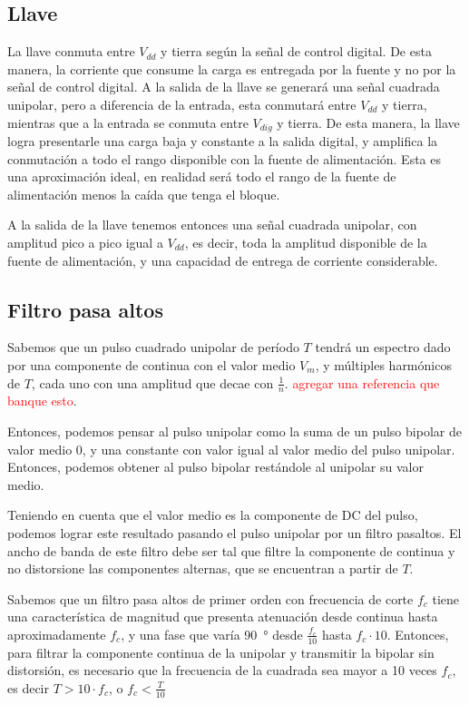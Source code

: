\subsection{Llave}

La llave conmuta entre $V_{dd}$ y tierra según la señal de control digital. De
esta manera, la corriente que consume la carga es entregada por la fuente y no
por la señal de control digital. A la salida de la llave se generará una señal
cuadrada unipolar, pero a diferencia de la entrada, esta conmutará entre
$V_{dd}$ y tierra, mientras que a la entrada se conmuta entre $V_{dig}$ y
tierra. De esta manera, la llave logra presentarle una carga baja y constante a
la salida digital, y amplifica la conmutación a todo el rango disponible con la
fuente de alimentación. Esta es una aproximación ideal, en realidad será todo el
rango de la fuente de alimentación menos la caída que tenga el bloque.

A la salida de la llave tenemos entonces una señal cuadrada unipolar, con
amplitud pico a pico igual a $V_{dd}$, es decir, toda la amplitud disponible de
la fuente de alimentación, y una capacidad de entrega de corriente considerable.

\subsection{Filtro pasa altos}

Sabemos que un pulso cuadrado unipolar de período $T$ tendrá un espectro dado
por una componente de continua con el valor medio $V_{m}$, y múltiples
harmónicos de $T$, cada uno con una amplitud que decae con $\frac{1}{n}$.
\textcolor{red}{agregar una referencia que banque esto}.

Entonces, podemos pensar al pulso unipolar como la suma de un pulso bipolar de
valor medio 0, y una constante con valor igual al valor medio del pulso
unipolar. Entonces, podemos obtener al pulso bipolar restándole al unipolar su
valor medio.

Teniendo en cuenta que el valor medio es la componente de DC del pulso, podemos
lograr este resultado pasando el pulso unipolar por un filtro pasaltos. El ancho
de banda de este filtro debe ser tal que filtre la componente de continua y no
distorsione las componentes alternas, que se encuentran a partir de $T$.

Sabemos que un filtro pasa altos de primer orden con frecuencia de corte $f_c$
tiene una característica de magnitud que presenta atenuación desde continua hasta
aproximadamente $f_c$, y una fase que varía \qty{90}{\degree} desde
$\frac{f_c}{10}$ hasta $f_c \cdot 10$. Entonces, para filtrar la componente
continua de la unipolar y transmitir la bipolar sin distorsión,
es necesario que la frecuencia de la cuadrada sea mayor a 10 veces $f_c$, es
decir $T > 10 \cdot f_c$, o $f_c < \frac{T}{10}$

